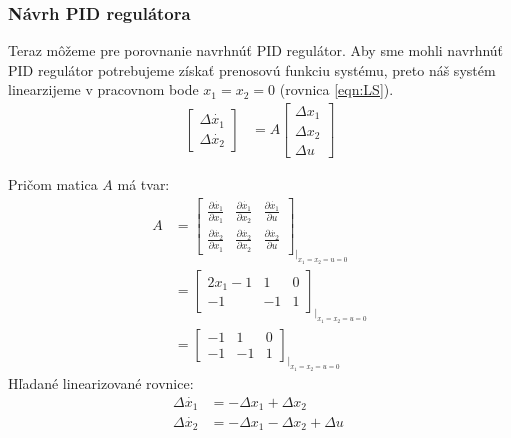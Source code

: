 \documentclass[../main.tex]{subfiles}
\begin{document}
\subsubsection{Návrh PID regulátora}
Teraz môžeme pre porovnanie navrhnúť PID regulátor. Aby sme mohli navrhnúť PID regulátor potrebujeme získať prenosovú funkciu systému, preto náš systém linearzijeme v pracovnom bode $x_1 = x_2 = 0$ (rovnica \ref{eqn:LS}).
\begin{equation}
\begin{split} 
\begin{bmatrix} \Delta \dot{x_1} \\ \Delta \dot{x_2} \end{bmatrix}  & = A\begin{bmatrix} \Delta {x_1} \\ \Delta {x_2} \\ \Delta u \end{bmatrix}
 \end{split}
 \label{eqn:LS}
\end{equation}	

Pričom matica $A$ má tvar:
\begin{equation}
\begin{aligned} 
 A  & = \begin{bmatrix} \frac{\partial \dot{x_1}}{\partial x_1}& \frac{\partial \dot{x_1}}{\partial x_2}& \frac{\partial \dot{x_1}}{\partial u} \\ \frac{\partial \dot{x_2}}{\partial x_1}&\frac{\partial \dot{x_2}}{\partial x_2} & \frac{\partial \dot{x_2}}{\partial u}\end{bmatrix}_{|_{x_1 = x_2 = u = 0}} \\
 & = \begin{bmatrix} 2x_1-1 & 1 & 0 \\ -1 & -1 & 1 \end{bmatrix}_{|_{x_1 = x_2 = u = 0}} \\
  & = \begin{bmatrix} -1 & 1 & 0 \\ -1 & -1 & 1 \end{bmatrix}_{|_{x_1 = x_2 = u = 0}} \
 \end{aligned}
 \label{eqn:AL}
\end{equation}	
Hľadané linearizované rovnice: 
\begin{equation}
\begin{aligned} 
\Delta \dot{x_1}  &= -\Delta x_1 + \Delta x_2 \\
\Delta \dot{x_2} & = -\Delta x_1 - \Delta x_2 + \Delta u \
 \end{aligned}
 \label{eqn:LR}
\end{equation}	
\end{document}
